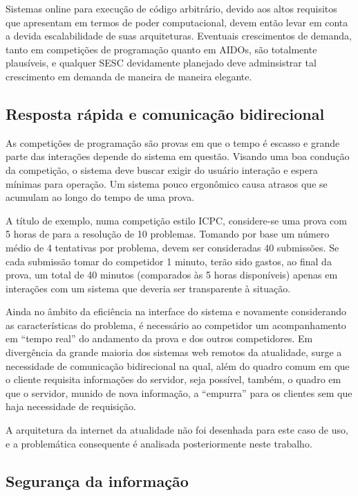 \documentclass[ruledheader, 12pt]{abnt}
\begin{document}
Sistemas online para execução de código arbitrário, devido aos altos requisitos que apresentam em termos de poder computacional, devem então levar em conta a devida escalabilidade de suas arquiteturas. Eventuais crescimentos de demanda, tanto em competições de programação quanto em AIDOs, são totalmente plausíveis, e qualquer SESC devidamente planejado deve adminsistrar tal crescimento em demanda de maneira de maneira elegante.

\subsection{Resposta rápida e comunicação bidirecional}

As competições de programação são provas em que o tempo é escasso e grande parte das interações depende do sistema em questão. Visando uma boa condução da competição, o sistema deve buscar exigir do usuário interação e espera mínimas para operação. Um sistema pouco ergonômico causa atrasos que se acumulam ao longo do tempo de uma prova.

A título de exemplo, numa competição estilo ICPC, considere-se uma prova com 5 horas de para a resolução de 10 problemas. Tomando por base um número médio de 4 tentativas por problema, devem ser consideradas 40 submissões. Se cada submissão tomar do competidor 1 minuto, terão sido gastos, ao final da prova, um total de 40 minutos (comparados às 5 horas disponíveis) apenas em interações com um sistema que deveria ser transparente à situação.

Ainda no âmbito da eficiência na interface do sistema e novamente considerando as características do problema, é necessário ao competidor um acompanhamento em ``tempo real'' do andamento da prova e dos outros competidores. Em divergência da grande maioria dos sistemas web remotos da atualidade, surge a necessidade de comunicação bidirecional na qual, além do quadro comum em que o cliente requisita informações do servidor, seja possível, também, o quadro em que o servidor, munido de nova informação, a ``empurra'' para os clientes sem que haja necessidade de requisição.

A arquitetura da internet da atualidade não foi desenhada para este caso de uso, e a problemática consequente é analisada posteriormente neste trabalho.

\subsection{Segurança da informação}
\end{document}
